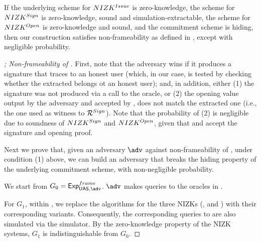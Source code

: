 \begin{theorem}
  \label{thm:frame-uas}
  If the underlying scheme for $NIZK^{Issue}$ is zero-knowledge, the scheme
  for $NIZK^{Sign}$ is zero-knowledge, sound and simulation-extractable, the
  scheme for $NIZK^{Open}$ is zero-knowledge and sound, and the commitment
  scheme is hiding, then our \CUASGen construction satisfies non-frameability as
  defined in , except with negligible probability.
\end{theorem}

\begin{proof}[; Non-frameability of \CUASGen]
  First, note that the adversary wins if it produces a signature that traces to
  an honest user (which, in our case, is tested by checking whether the
  extracted \usk belongs ot an honest user); and, in addition, either (1) the
  signature was not produced via a call to the \SIGN oracle, or (2) the opening
  value output by the adversary and accepted by \Judge, does not match the
  extracted one (i.e., the one used as witness to $\mathcal{R}^{Sign}$). Note that
  the probability of (2) is negligible due to soundness of $NIZK^{Sign}$ and
  $NIZK^{Open}$, given that \Verify and \Judge accept the signature and
  opening proof.
  
  Next we prove that, given an adversary $\adv$ against non-frameability of
  \CUASGen, under condition (1) above, we can build an adversary \advB that
  breaks the hiding property of the underlying commitment scheme, with
  non-negligible probability.

  We start from $G_0=\ExpNonframe$. $\adv$ makes queries to the oracles in
  \Oframe.

  For $G_1$, within \Setup, we replace the \Setup algorithms for the three
  NIZKs (\Issue, \Sign and \Open) with their corresponding \SimSetup
  variants. Consequently, the corresponding queries to \Prove are also
  simulated via the simulator. By the zero-knowledge property of the NIZK
  systems, $G_1$ is indistinguishable from $G_0$.
  

\end{proof}
